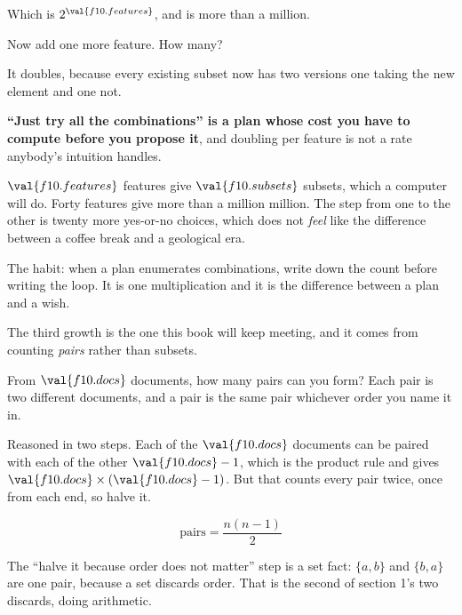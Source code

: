 \begin{fr}
Which is $2^{\val{f10.features}}$, and is more than a million.

Now add one more feature. How many?
\nextframe
\end{fr}

\begin{fr}
It doubles, because every existing subset now has two versions \dash{} one
taking the new element and one not.

\begin{trapbox}
\textbf{\enquote{Just try all the combinations} is a plan whose cost you have
to compute before you propose it}, and doubling per feature is not a rate
anybody's intuition handles.

$\val{f10.features}$ features give $\val{f10.subsets}$ subsets, which a
computer will do. Forty features give more than a million million. The step
from one to the other is twenty more yes-or-no choices, which does not
\emph{feel} like the difference between a coffee break and a geological era.

The habit: when a plan enumerates combinations, write down the count before
writing the loop. It is one multiplication and it is the difference between a
plan and a wish.
\end{trapbox}
\end{fr}

\begin{fr}
The third growth is the one this book will keep meeting, and it comes from
counting \emph{pairs} rather than subsets.

From $\val{f10.docs}$ documents, how many pairs can you form? Each pair is two
different documents, and a pair is the same pair whichever order you name it
in.
\nextframe
\end{fr}

\begin{fr}
Reasoned in two steps. Each of the $\val{f10.docs}$ documents can be paired
with each of the other $\val{f10.docs} - 1$, which is the product rule and
gives $\val{f10.docs} \times (\val{f10.docs} - 1)$. But that counts every pair
twice, once from each end, so halve it.

\[ \text{pairs} = \frac{n(n-1)}{2} \]

The \enquote{halve it because order does not matter} step is a set fact:
$\{a, b\}$ and $\{b, a\}$ are one pair, because a set discards order. That is
the second of section 1's two discards, doing arithmetic.

\end{fr}

